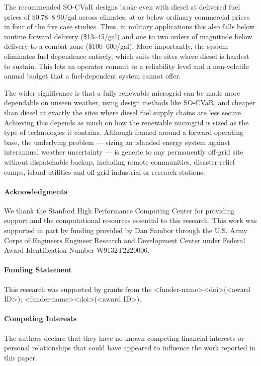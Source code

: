 \documentclass[
  journal=large,
  manuscript=article-type,
  year=2020,
  volume=37,
]{cup-journal}
\begin{document}
The recommended SO-CVaR designs broke even with diesel at delivered fuel prices of \$0.78--8.90/gal across climates, at or below ordinary commercial prices in four of the five case studies. Thus, in military applications this also falls below routine forward delivery (\$13--45/gal) and one to two orders of magnitude below delivery to a combat zone (\$100--600/gal). More importantly, the system eliminates fuel dependence entirely, which suits the sites where diesel is hardest to sustain. This lets an operator commit to a reliability level and a non-volatile annual budget that a fuel-dependent system cannot offer.

The wider significance is that a fully renewable microgrid can be made more dependable on unseen weather, using design methods like SO-CVaR, and cheaper than diesel at exactly the sites where diesel fuel supply chains are less secure. Achieving this depends as much on how the renewable microgrid is sized as the type of technologies it contains. Although framed around a forward operating base, the underlying problem --- sizing an islanded energy system against interannual weather uncertainty --- is generic to any permanently off-grid site without dispatchable backup, including remote communities, disaster-relief camps, island utilities and off-grid industrial or research stations.

\paragraph{Acknowledgments}
We thank the Stanford High Performance Computing Center for providing support and the computational resources essential to this research. This work was supported in part by funding provided by Dan Sambor through the U.S. Army Corps of Engineers Engineer Research and Development Center under Federal Award Identification Number W9132T2220006.

\paragraph{Funding Statement}
This research was supported by grants from the <funder-name><doi>(<award ID>); <funder-name><doi>(<award ID>).

\paragraph{Competing Interests}
The authors declare that they have no known competing financial interests or personal relationships that could have appeared to influence the work reported in this paper.
\end{document}
